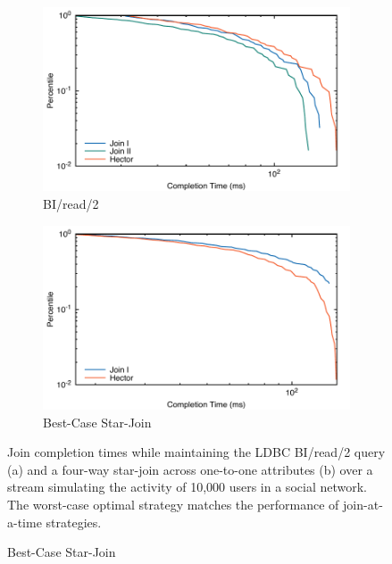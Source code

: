 \documentclass[../catalog.tex]{subfiles}
\begin{document}
\begin{figure}
  \begin{subfigure}{.5\textwidth}
    \centering
    \includegraphics[width=1.0\linewidth]{results/bi_read_2/out/all_cdfs}
    \caption{BI/read/2}
    \label{fig:average-cdfs}
  \end{subfigure}
  \begin{subfigure}{.5\textwidth}
    \centering
    \includegraphics[width=1.0\linewidth]{results/best_case/out/all_cdfs}
    \caption{Best-Case Star-Join}
    \label{fig:best-case-cdfs}
  \end{subfigure}

  \medskip
  \small

  Join completion times while maintaining the LDBC BI/read/2 query (a)
  and a four-way star-join across one-to-one attributes (b) over a
  stream simulating the activity of 10,000 users in a social
  network. The worst-case optimal strategy matches the performance of
  join-at-a-time strategies.
\end{figure}
\end{document}
